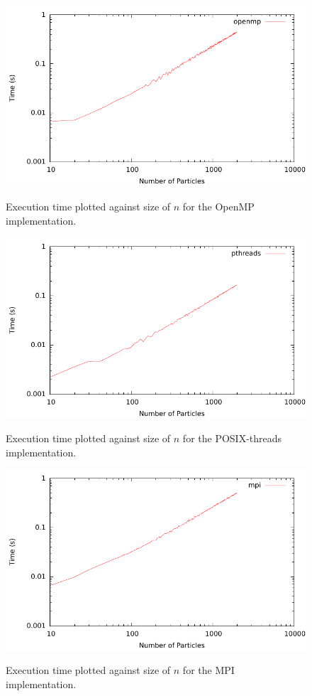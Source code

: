\begin{figure}[H]
	\includegraphics{plots/openmp.pdf}
	\label{openmp_linear}
	\caption{Execution time plotted against size of $n$ for the OpenMP implementation.}
\end{figure}
\begin{figure}[H]
	\includegraphics{plots/pthreads.pdf}
	\label{pthreads_linear}
	\caption{Execution time plotted against size of $n$ for the POSIX-threads implementation.}
\end{figure}

\begin{figure}[H]
	\includegraphics{plots/mpi.pdf}
	\label{mpi_linear}
	\caption{Execution time plotted against size of $n$ for the MPI implementation.}
\end{figure}

